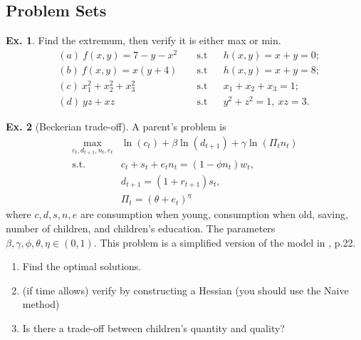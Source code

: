 \documentclass[11pt,a4paper]{book}
\theoremstyle{definition}\newtheorem{definition}{Definition}
\theoremstyle{definition}\newtheorem{fact}{Fact}
\theoremstyle{definition}\newtheorem{remark}{Remark}
\theoremstyle{definition}\newtheorem{ex}{Ex.}
\theoremstyle{definition}\newtheorem{project}{Project}
\theoremstyle{definition}\newtheorem{problem}{Problem}
\theoremstyle{definition}\newtheorem{example}{Example}
\numberwithin{theorem}{section}
\numberwithin{corollary}{chapter}
\numberwithin{assumption}{chapter}
\numberwithin{definition}{chapter}
\numberwithin{prop}{chapter}
\numberwithin{notation}{chapter}
\numberwithin{problem}{chapter}
\numberwithin{example}{chapter}
\numberwithin{fact}{chapter}
\numberwithin{ex}{chapter}
\begin{document}
	\subsection{Problem Sets}
	
	\begin{ex}
		Find the extremum, then verify it is either max or min.
		\begin{align*}
			& (a) \ f(x,y) = 7 - y - x^2  && \text{ s.t} && h(x,y) = x + y =0; \\
			& (b) \ f(x,y) = x(y+4) && \text{ s.t} && h(x,y) = x + y = 8; \\
			& (c) \ x_1^2+x_2^2+x_3^2 && \text{ s.t} && x_1+x_2+x_3=1; \\
			& (d) \ yz + xz && \text{ s.t} && y^2 + z^2 = 1, \ xz=3.
		\end{align*}
	\end{ex}
	
	\begin{ex}[Beckerian trade-off] \label{ex:ferti}
		A parent's problem is
		\begin{align*}
			\max_{c_t, d_{t+1}, n_t, e_t} & \ln(c_t) + \beta \ln (d_{t+1}) + \gamma \ln ( \Pi_t n_t) \\
			\text{s.t.}\ & c_t + s_t +e_tn_t = (1-\phi n_t) w_t, \\
			& d_{t+1} = (1+r_{t+1}) s_t, \\
			& \Pi_t = (\theta + e_t)^\eta
		\end{align*}
		where $c,d,s,n,e$ are consumption when young, consumption when old, saving, number of children, and children's education. The parameters $\beta,\gamma,\phi,\theta,\eta \in (0,1)$. This problem is a simplified version of the model in \citet{de2012fertility}, p.22. 
		\begin{enumerate}
			\item Find the optimal solutions.
			\item (if time allows) verify by constructing a Hessian (you should use the Naive method)
			\item Is there a trade-off between children's quantity and quality?
		\end{enumerate}
	\end{ex}
	
\end{document}
